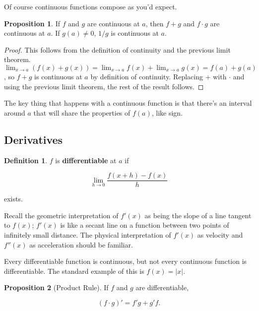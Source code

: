 \documentclass{article}
\theoremstyle{definition}
\newtheorem{definition}{Definition}[section]
\newtheorem{proposition}{Proposition}[section]
\begin{document}
Of course continuous functions compose as you'd expect.

\begin{proposition}

If $f$ and $g$ are continuous at $a$, then $f+g$ and $f \cdot g$ are continuous
at $a$. If $g(a) \neq 0$, $1/g$ is continuous at $a$.

\end{proposition}

\begin{proof}

This follows from the definition of continuity and the previous limit
theorem. $\lim_{x \to a} (f(x) + g(x)) = \lim_{x \to a} f(x) + \lim_{x \to a}
g(x) = f(a) + g(a)$, so $f + g$ is continuous at $a$ by definition of
continuity. Replacing $+$ with $\cdot$ and using the previous limit theorem, the
rest of the result follows.

\end{proof}

The key thing that happens with a continuous function is that there's an
interval around $a$ that will share the properties of $f(a)$, like sign.

\subsection{Derivatives}

\begin{definition} 
$f$ is \textbf{differentiable} at $a$ if

\begin{equation}
\lim_{h \to 0} \frac{f(x+h) - f(x)}{h}
\end{equation}

exists.
\end{definition}

Recall the geometric interpretation of $f'(x)$ as being the slope of a line
tangent to $f(x)$; $f'(x)$ is like a secant line on a function between two
points of infinitely small distance. The physical interpretation of $f'(x)$ as
velocity and $f''(x)$ as acceleration should be familiar.

Every differentiable function is continuous, but not every continuous function is differentiable. The standard example of this is $f(x) = |x|$.

\begin{proposition}[Product Rule] 

If $f$ and $g$ are differentiable, 

\begin{equation}
(f \cdot g)' = f'g + g'f.
\end{equation}


\end{proposition} 
\end{document}
